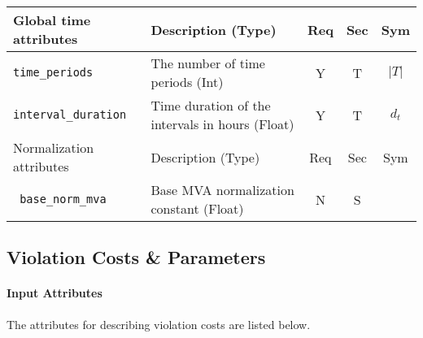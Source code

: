 \documentclass{article}
\begin{document}
\begin{center}
\small
\begin{tabular}{ l | l | c | c | c |}
Global time attributes & Description (Type) & Req & Sec & Sym\\
\hline
  {\tt time\_periods} & The number of time periods (Int) & Y & T & $\lvert T \rvert$ \\
  {\tt interval\_duration} & Time duration of the intervals in hours (Float) & Y & T & $d_t$ \\
\hline
Normalization attributes & Description (Type) & Req & Sec & Sym\\
\hline  
{\tt\color{red} base\_norm\_mva} & Base MVA normalization constant (Float)  & N & S &  \\
  \hline
\end{tabular}
\end{center}

\subsection{Violation Costs \& Parameters}
\label{nom:violation}
\paragraph{Input Attributes} The attributes for describing violation costs are listed below.
\end{document}
